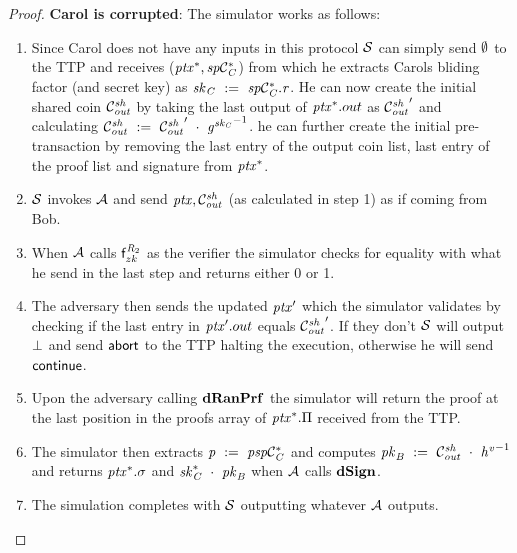 \begin{proof}
    \textbf{Carol is corrupted}: The simulator works as follows:
    \begin{enumerate}
        \item Since Carol does not have any inputs in this protocol $\mathcal{S}$ can simply send $\emptyset$ to the TTP and receives ($\mathit{ptx}^*, \mathit{sp}\mathcal{C}_{\mathit{C}}^*$) from which he extracts Carols bliding factor (and secret key) as $\mathit{sk}_{\mathit{C}} ~:=~ \mathit{sp}\mathcal{C}_{\mathit{C}}^*.\mathit{r}$.
        He can now create the initial shared coin $\mathcal{C}_{\mathit{out}}^{\mathit{sh}}$ by taking the last output of $\mathit{ptx}^*.out$ as ${\mathcal{C}_{\mathit{out}}^{\mathit{sh}}}'$ and calculating $\mathcal{C}_{\mathit{out}}^{\mathit{sh}} ~:=~ {\mathcal{C}_{\mathit{out}}^{\mathit{sh}}}' ~\cdot~ {\mathit{g}^{\mathit{sk}_{\mathit{C}}}}^{-1}$.
        he can further create the initial pre-transaction by removing the last entry of the output coin list, last entry of the proof list and signature from $\mathit{ptx}^*$.
        \item $\mathcal{S}$ invokes $\mathcal{A}$ and send $\mathit{ptx}, \mathcal{C}_{\mathit{out}}^{\mathit{sh}}$ (as calculated in step 1) as if coming from Bob.
        \item When $\mathcal{A}$ calls $\mathsf{f}^{\mathit{R}_2}_{zk}$ as the verifier the simulator checks for equality with what he send in the last step and returns either 0 or 1.
        \item The adversary then sends the updated ${\mathit{ptx}}'$ which the simulator validates by checking if the last entry in ${\mathit{ptx}}'.out$ equals ${\mathcal{C}_{\mathit{out}}^{\mathit{sh}}}'$.
        If they don't $\mathcal{S}$ will output $\bot$ and send $\mathsf{abort}$ to the TTP halting the execution, otherwise he will send $\mathsf{continue}$.
        \item Upon the adversary calling $\mathbf{dRanPrf}$ the simulator will return the proof at the last position in the proofs array of $\mathit{ptx}^*.\Pi$ received from the TTP.
        \item The simulator then extracts $\mathit{p} ~:=~ \mathit{psp}\mathcal{C}_{\mathit{C}}^*$ and computes $\mathit{pk}_{\mathit{B}} ~:=~ \mathcal{C}_{\mathit{out}}^{\mathit{sh}} ~\cdot~ {\mathit{h}^{\mathit{v}}}^{-1}$ and returns $\mathit{ptx}^*.\sigma$ and $\mathit{sk}_{\mathit{C}}^* ~\cdot~ \mathit{pk}_{\mathit{B}}$ when $\mathcal{A}$ calls $\mathbf{dSign}$.
        \item The simulation completes with $\mathcal{S}$ outputting whatever $\mathcal{A}$ outputs.
    \end{enumerate}


\end{proof}
